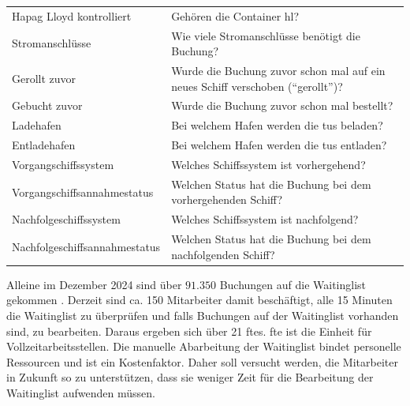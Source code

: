 \begin{longtable}{lp{9cm}}
Hapag Lloyd kontrolliert & Gehören die Container \gls{hl}? \\
Stromanschlüsse & Wie viele Stromanschlüsse benötigt die Buchung? \\
Gerollt zuvor & Wurde die Buchung zuvor schon mal auf ein neues Schiff verschoben (\enquote{gerollt})? \\
Gebucht zuvor & Wurde die Buchung zuvor schon mal bestellt? \\
Ladehafen & Bei welchem Hafen werden die \glspl{tu} beladen? \\
Entladehafen & Bei welchem Hafen werden die \glspl{tu} entladen? \\
Vorgangschiffssystem & Welches Schiffssystem ist vorhergehend? \\
Vorgangschiffsannahmestatus & Welchen Status hat die Buchung bei dem vorhergehenden Schiff? \\
Nachfolgeschiffssystem & Welches Schiffssystem ist nachfolgend? \\
Nachfolgeschiffsannahmestatus & Welchen Status hat die Buchung bei dem nachfolgenden Schiff?\\
\end{longtable}


Alleine im Dezember 2024 sind über $91.350$ Buchungen auf die Waitinglist gekommen \cite{BALBOA2025}.
Derzeit sind ca. 150 Mitarbeiter damit beschäftigt, alle 15 Minuten die Waitinglist zu überprüfen und falls Buchungen auf der Waitinglist vorhanden sind, zu bearbeiten. Daraus ergeben sich über 21 \glspl{fte}. \gls{fte} ist die Einheit für Vollzeitarbeitsstellen. 
Die manuelle Abarbeitung der Waitinglist bindet personelle Ressourcen und ist ein Kostenfaktor. Daher soll versucht werden, die Mitarbeiter in Zukunft so zu unterstützen, dass sie weniger Zeit für die Bearbeitung der Waitinglist aufwenden müssen.



